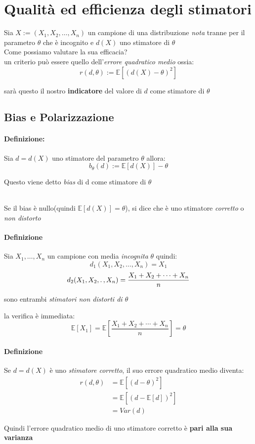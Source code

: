 \documentclass[]{article}
\newcommand{\ev}{\mathbb{E}[X]}
\renewcommand{\ev}[1]{\mathbb{E}\left[#1\right]}
\newcommand{\definizione}{\paragraph{Definizione:}}
\begin{document}
    \section{Qualità ed efficienza degli stimatori}
    Sia $X := (X_1, X_2, \ldots, X_n)$ un campione di una distribuzione \textit{nota} tranne per il parametro $\theta$ che è incognito e $d(X)$ uno stimatore di $\theta$ \\
    Come possiamo valutare la sua efficacia? \\
    un criterio può essere quello dell'\textit{errore quadratico medio} ossia:
    \[ r(d, \theta) := \ev{(d(X) - \theta)^2} \]
    \centerline{sarà questo il nostro \textbf{indicatore} del valore di $d$ come stimatore di $\theta$}
    \subsection{Bias e Polarizzazione}
    \definizione Sia $d= d(X)$ uno stimatore del parametro $\theta$ allora:
    \[ b_\theta (d) := \ev{d(X)} - \theta \]
    \centerline{Questo viene detto \textit{bias} di d come stimatore di $\theta$} \\[2ex]
    Se il bias è nullo(quindi $\ev{d(X)} = \theta$), si dice che è uno stimatore \textit{corretto} o \textit{non distorto}
    \paragraph{Definizione} Sia $X_1, \ldots, X_n$ un campione con media \textit{incognita} $\theta$ quindi:
    \[ d_1 (X_1, X_2, \ldots, X_n) = X_1 \]
    \[ d_2 (X_1, X_2, \ldotp, X_n) = \frac{X_1 + X_2 + \cdots + X_n}{n} \]
    \centerline{sono entrambi \textit{stimatori non distorti di $\theta$}}
    la verifica è immediata:
    \[ \ev{X_1} = \ev{\frac{X_1 + X_2 + \cdots + X_n}{n}} = \theta \]
    \paragraph{Definizione} Se $d = d(X)$ è uno \textit{stimatore corretto}, il suo errore quadratico medio diventa:
    \begin{equation*}
        \begin{split}
            r(d, \theta) &= \ev{(d- \theta)^2} \\
            &= \ev{(d-\ev{d})^2} \\
            &= Var(d)
        \end{split}
    \end{equation*}
    \centerline{Quindi l'errore quadratico medio di uno stimatore corretto è \textbf{pari alla sua varianza}}
\end{document}
